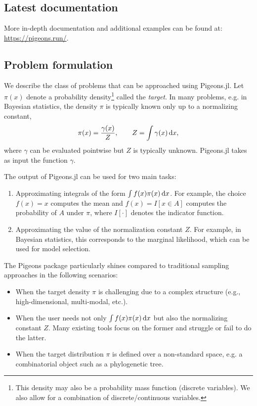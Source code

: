 \subsection{Latest documentation}

More in-depth documentation and additional examples can be found at: {\renewcommand{\UrlFont}{\ttfamily\normalsize}\url{https://pigeons.run/}}. 

\subsection{Problem formulation}
We describe the class of problems that can be approached using Pigeons.jl.
Let $\pi(x)$ denote a probability density\footnote{This density may 
also be a probability mass function 
(discrete variables). We also allow for a combination of discrete/continuous variables.} 
called the \emph{target}. 
In many problems, e.g. in Bayesian statistics, the density $\pi$ is typically 
known only up to a normalizing constant, 
\[
\label{eq:normalizing_constant}
  \pi(x) = \frac{\gamma(x)}{Z}, \qquad Z = \int \gamma(x) \, \dee x,
\]  
where $\gamma$ can be evaluated pointwise but $Z$ is typically unknown.
Pigeons.jl takes as input the function $\gamma$.

 
The output of Pigeons.jl can be used for two main tasks:
\begin{enumerate}
    \item Approximating integrals of the form $\int f(x) \pi(x) \, \mathrm{d} x$.  
    For example, the choice $f(x) = x$ computes the mean and 
    $f(x) = I[x \in A]$ computes the probability of $A$ under $\pi$,
    where $I[\cdot]$ denotes the indicator function.

    \item Approximating the value of the normalization constant $Z$. For 
    example, in Bayesian statistics, this corresponds to the 
    marginal likelihood, which can be used for model selection. 
\end{enumerate}
The Pigeons package particularly shines compared to traditional sampling approaches in the 
following scenarios:
\begin{itemize}
    \item When the target density $\pi$ is challenging due to a complex structure 
    (e.g., high-dimensional, multi-modal, etc.).
    
    \item When the user needs not only $\int f(x) \pi(x) \, \mathrm{d} x$ but also
    the normalizing constant $Z$. 
    Many existing tools focus on the former and struggle or fail to do the latter. 
    
    \item When the target distribution $\pi$ is defined over a non-standard space, 
    e.g. a combinatorial object such as a phylogenetic tree.  
\end{itemize}


